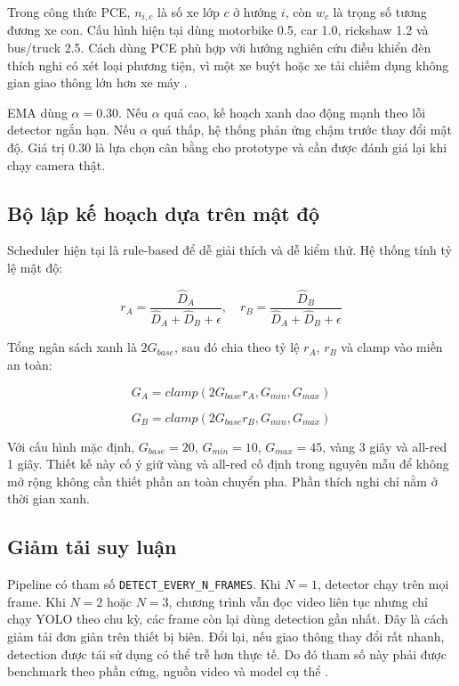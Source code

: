 Trong công thức PCE, \(n_{i,c}\) là số xe lớp \(c\) ở hướng \(i\), còn \(w_c\) là trọng số tương đương xe con. Cấu hình hiện tại dùng motorbike 0.5, car 1.0, rickshaw 1.2 và bus/truck 2.5. Cách dùng PCE phù hợp với hướng nghiên cứu điều khiển đèn thích nghi có xét loại phương tiện, vì một xe buýt hoặc xe tải chiếm dụng không gian giao thông lớn hơn xe máy \cite{raza2025edge,nguyen_yolov8_density}.

EMA dùng \(\alpha=0.30\). Nếu \(\alpha\) quá cao, kế hoạch xanh dao động mạnh theo lỗi detector ngắn hạn. Nếu \(\alpha\) quá thấp, hệ thống phản ứng chậm trước thay đổi mật độ. Giá trị 0.30 là lựa chọn cân bằng cho prototype và cần được đánh giá lại khi chạy camera thật.

\subsection{Bộ lập kế hoạch dựa trên mật độ}

Scheduler hiện tại là rule-based để dễ giải thích và dễ kiểm thử. Hệ thống tính tỷ lệ mật độ:

\begin{equation}
r_A = \frac{\hat{D}_A}{\hat{D}_A + \hat{D}_B + \epsilon}, \quad
r_B = \frac{\hat{D}_B}{\hat{D}_A + \hat{D}_B + \epsilon}
\end{equation}

Tổng ngân sách xanh là \(2G_{base}\), sau đó chia theo tỷ lệ \(r_A\), \(r_B\) và clamp vào miền an toàn:

\begin{equation}
G_A = clamp(2G_{base}r_A, G_{min}, G_{max})
\end{equation}

\begin{equation}
G_B = clamp(2G_{base}r_B, G_{min}, G_{max})
\end{equation}

Với cấu hình mặc định, \(G_{base}=20\), \(G_{min}=10\), \(G_{max}=45\), vàng 3 giây và all-red 1 giây. Thiết kế này cố ý giữ vàng và all-red cố định trong nguyên mẫu để không mở rộng không cần thiết phần an toàn chuyển pha. Phần thích nghi chỉ nằm ở thời gian xanh.

\subsection{Giảm tải suy luận}

Pipeline có tham số \texttt{DETECT\_EVERY\_N\_FRAMES}. Khi \(N=1\), detector chạy trên mọi frame. Khi \(N=2\) hoặc \(N=3\), chương trình vẫn đọc video liên tục nhưng chỉ chạy YOLO theo chu kỳ, các frame còn lại dùng detection gần nhất. Đây là cách giảm tải đơn giản trên thiết bị biên. Đổi lại, nếu giao thông thay đổi rất nhanh, detection được tái sử dụng có thể trễ hơn thực tế. Do đó tham số này phải được benchmark theo phần cứng, nguồn video và model cụ thể \cite{opencv_videocapture}.
